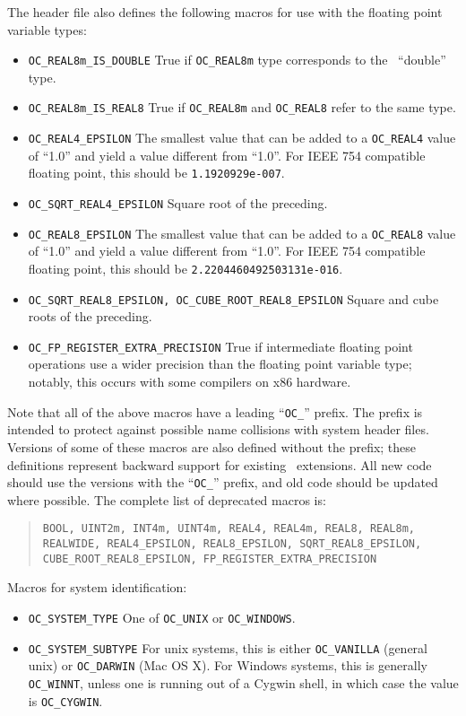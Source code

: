 {The  header file also
defines the following macros for use with the floating point variable
types:
\begin{itemize}
\item{\texttt{OC\_REAL8m\_IS\_DOUBLE}} \gbs True if \texttt{OC\_REAL8m} type
  corresponds to the \Cplusplus\ ``double'' type.
\item{\texttt{OC\_REAL8m\_IS\_REAL8}} \gbs True if \texttt{OC\_REAL8m} and
  \texttt{OC\_REAL8} refer to the same type.
\item{\texttt{OC\_REAL4\_EPSILON}} \gbs The smallest value that can be added to
  a \texttt{OC\_REAL4} value of ``1.0'' and yield a value different from
  ``1.0''.  For IEEE 754 compatible floating point, this should be
  \texttt{1.1920929e-007}.
\item{\texttt{OC\_SQRT\_REAL4\_EPSILON}}
    \gbs Square root of the preceding.
\item{\texttt{OC\_REAL8\_EPSILON}} \gbs The smallest value that can be added to
  a \texttt{OC\_REAL8} value of ``1.0'' and yield a value different from
  ``1.0''.  For IEEE 754 compatible floating point, this should be
  \texttt{2.2204460492503131e-016}.
\item{\texttt{OC\_SQRT\_REAL8\_EPSILON, OC\_CUBE\_ROOT\_REAL8\_EPSILON}}
    \gbs Square and cube roots of the preceding.
\item{\texttt{OC\_FP\_REGISTER\_EXTRA\_PRECISION}} \gbs True if
  intermediate floating point operations use a wider precision than
  the floating point variable type; notably, this occurs with some
  compilers on x86 hardware.
\end{itemize}

Note that all of the above macros have a leading ``\texttt{OC\_}''
prefix.  The prefix is intended to protect against possible name
collisions with system header files.  Versions of some of these macros
are also defined without the prefix; these definitions represent
backward support for existing \OOMMF\ extensions.  All new code
should use the versions with the ``\texttt{OC\_}'' prefix, and old code
should be updated where possible.  The complete list of deprecated
macros is:
\begin{quote}
\texttt{BOOL, UINT2m, INT4m, UINT4m,
    REAL4, REAL4m, REAL8, REAL8m, REALWIDE,
    REAL4\_EPSILON, REAL8\_EPSILON,
    SQRT\_REAL8\_EPSILON, CUBE\_ROOT\_REAL8\_EPSILON,
    FP\_REGISTER\_EXTRA\_PRECISION
}
\end{quote}

Macros for system identification:
\begin{itemize}
\item{\texttt{OC\_SYSTEM\_TYPE}} \gbs One of \texttt{OC\_UNIX} or
  \texttt{OC\_WINDOWS}.
\item{\texttt{OC\_SYSTEM\_SUBTYPE}} \gbs For unix systems, this is
    either \texttt{OC\_VANILLA} (general unix) or \texttt{OC\_DARWIN}
    (Mac OS X).  For Windows systems, this is generally
    \texttt{OC\_WINNT}, unless one is running out of a Cygwin shell,
    in which case the value is \texttt{OC\_CYGWIN}.
\end{itemize}

}
